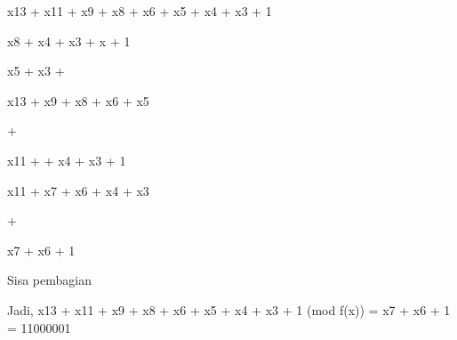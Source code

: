 \documentclass{article}
\begin{document}

x13 + x11 + x9 + x8 + x6 + x5 + x4 + x3 +  1 

x8 +  x4 +  x3 + x + 1 

x5 + x3 + 


x13               + x9 + x8 + x6 + x5 

+

x11 +                            + x4 + x3 +  1 

x11 +                x7 + x6 + x4 + x3  

+

x7 + x6                 +   1 

Sisa pembagian

Jadi, x13 + x11 + x9 + x8 + x6 + x5 + x4 + x3 + 1 (mod f(x)) = x7 + x6 + 1  = 11000001
\end{document}
